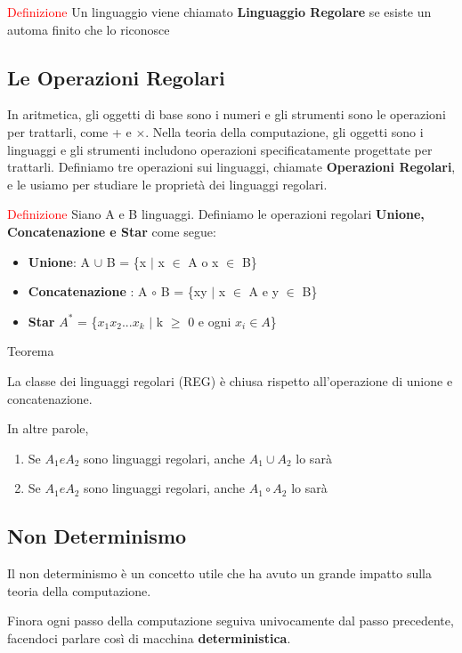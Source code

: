 \documentclass{article}
\begin{document}
\textcolor{red}{Definizione}
Un linguaggio viene chiamato \textbf{Linguaggio Regolare} se esiste un automa finito che lo riconosce

\subsection{Le Operazioni Regolari}
In aritmetica, gli oggetti di base sono i numeri e gli strumenti sono le operazioni per trattarli, come + e $\times$.
Nella teoria della computazione, gli oggetti sono i linguaggi e gli strumenti includono operazioni specificatamente progettate per trattarli. Definiamo tre operazioni sui linguaggi, chiamate \textbf{Operazioni Regolari}, e le usiamo per studiare le proprietà dei linguaggi regolari.

\textcolor{red}{Definizione}
Siano A e B linguaggi. Definiamo le operazioni regolari \textbf{Unione, Concatenazione e Star} come segue:
\begin{itemize}
    \item \textbf{Unione}: A $\cup$ B = \{x $\mid$ x $\in$ A o x $\in$ B\}
    \item \textbf{Concatenazione} : A $\circ$ B = \{xy $\mid$ x $\in$ A e y $\in$ B\}
    \item \textbf{Star} $A^*$ = \{$x_1x_2...x_k$ $\mid$ k $\geq$ 0 e ogni $x_i \in A$\}
\end{itemize}

\textcolor{green! 50! black}{Teorema}

La classe dei linguaggi regolari (REG) è chiusa rispetto all'operazione di unione e concatenazione.

In altre parole,
\begin{enumerate}
    \item Se $A_1 e A_2$ sono linguaggi regolari, anche $A_1 \cup A_2$ lo sarà
    \item Se $A_1 e A_2$ sono linguaggi regolari, anche $A_1 \circ A_2$ lo sarà
\end{enumerate}

\subsection{Non Determinismo}

Il non determinismo è un concetto utile che ha avuto un grande impatto sulla teoria della computazione.

Finora ogni passo della computazione seguiva univocamente dal passo precedente, facendoci parlare così di macchina \textbf{deterministica}.
\end{document}
